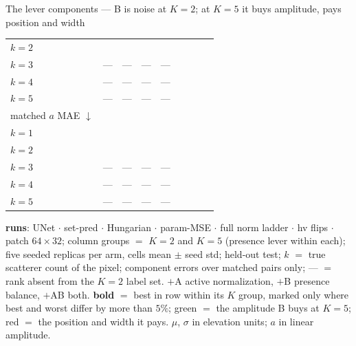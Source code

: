 \begin{frame}{The lever components --- B is noise at $K{=}2$; at $K{=}5$ it buys amplitude, pays position and width}
\begin{tabular}{@{}l cc !{\hspace{2pt}} cc !{\hspace{8pt}} cc !{\hspace{2pt}} cc@{}}
    \quad $k{=}2$ &  &  &  &  &  &  &  &  \\
    \quad $k{=}3$ & --- & --- & --- & --- &  &  &  &  \\
    \quad $k{=}4$ & --- & --- & --- & --- &  &  &  &  \\
    \quad $k{=}5$ & --- & --- & --- & --- &  &  &  &  \\
    \addlinespace
    matched $a$ MAE $\downarrow$ &  &  &  &  &  &  &  &  \\
    \quad $k{=}1$ &  &  &  &  &  &  &  &  \\
    \quad $k{=}2$ &  &  &  &  &  &  &  &  \\
    \quad $k{=}3$ & --- & --- & --- & --- &  &  &  &  \\
    \quad $k{=}4$ & --- & --- & --- & --- &  &  &  &  \\
    \quad $k{=}5$ & --- & --- & --- & --- &  &  &  &  \\
    \bottomrule
  \end{tabular}
  \par\vspace{3pt}
  \parbox{0.94\textwidth}{\tiny\color{soft} \textbf{runs}: UNet $\cdot$ set-pred $\cdot$ Hungarian $\cdot$ param-MSE $\cdot$ full norm ladder $\cdot$ hv flips $\cdot$ patch $64{\times}32$; column groups $=$ $K{=}2$ and $K{=}5$ (presence lever within each); five seeded replicas per arm, cells mean $\pm$ seed std; held-out test; $k$ $=$ true scatterer count of the pixel; component errors over matched pairs only; --- $=$ rank absent from the $K{=}2$ label set. $+$A active normalization, $+$B presence balance, $+$AB both. \textbf{bold} $=$ best in row within its $K$ group, marked only where best and worst differ by more than $5\%$; \textcolor{good}{green} $=$ the amplitude B buys at $K{=}5$; \textcolor{accent}{red} $=$ the position and width it pays. $\mu$, $\sigma$ in elevation units; $a$ in linear amplitude.\par}

\end{frame}

